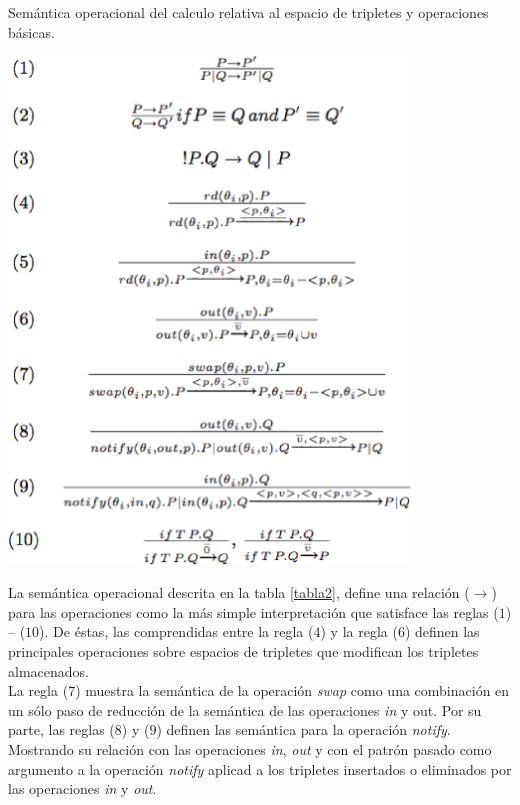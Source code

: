 \begin{table}
\vspace{2.4in}
\caption{Sem\'antica operacional del calculo relativa al espacio de tripletes y operaciones b\'asicas.}
\vspace{5mm}
\includegraphics[width=0.8\textwidth]{tabla2}
\label{tabla2}
\end{table}

La sem\'antica operacional descrita en la tabla \ref{tabla2}, define una relaci\'on ($\rightarrow$) para las operaciones como la m\'as simple interpretaci\'on que satisface las reglas ($1$) – ($10$). De \'estas, las comprendidas entre la regla ($4$)  y la regla ($6$) definen las principales operaciones sobre espacios de tripletes que modifican los tripletes almacenados.\\
La regla ($7$) muestra la sem\'antica de la operaci\'on \textit{swap} como una combinaci\'on en un s\'olo paso de reducci\'on de la sem\'antica de las operaciones \textit{in} y out. Por su parte, las reglas ($8$) y ($9$) definen las sem\'antica para la operaci\'on \textit{notify}. Mostrando su relaci\'on con las operaciones \textit{in}, \textit{out} y con el patr\'on pasado como argumento a la operaci\'on \textit{notify} aplicad a los tripletes insertados o eliminados por las operaciones \textit{in} y \textit{out}.\\

